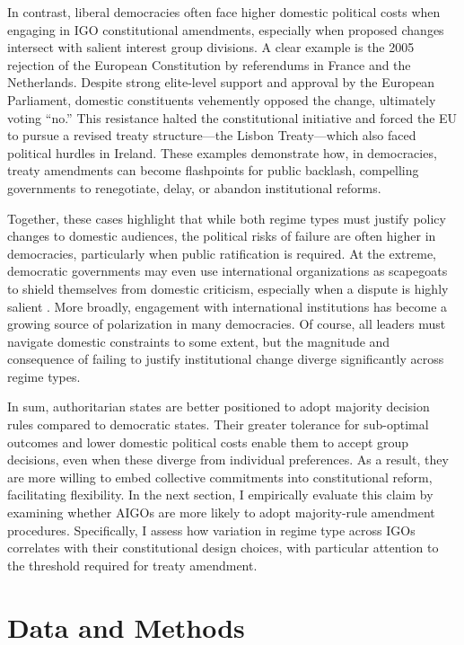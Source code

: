 \documentclass[12pt]{article}
\begin{document}
In contrast, liberal democracies often face higher domestic political costs when engaging in IGO constitutional amendments, especially when proposed changes intersect with salient interest group divisions. A clear example is the 2005 rejection of the European Constitution by referendums in France and the Netherlands. Despite strong elite-level support and approval by the European Parliament, domestic constituents vehemently opposed the change, ultimately voting ``no.'' This resistance halted the constitutional initiative and forced the EU to pursue a revised treaty structure---the Lisbon Treaty---which also faced political hurdles in Ireland. These examples demonstrate how, in democracies, treaty amendments can become flashpoints for public backlash, compelling governments to renegotiate, delay, or abandon institutional reforms.

Together, these cases highlight that while both regime types must justify policy changes to domestic audiences, the political risks of failure are often higher in democracies, particularly when public ratification is required. At the extreme, democratic governments may even use international organizations as scapegoats to shield themselves from domestic criticism, especially when a dispute is highly salient \parencite{lim_why_2022}. More broadly, engagement with international institutions has become a growing source of polarization in many democracies. Of course, all leaders must navigate domestic constraints to some extent, but the magnitude and consequence of failing to justify institutional change diverge significantly across regime types.

In sum, authoritarian states are better positioned to adopt majority decision rules compared to democratic states. Their greater tolerance for sub-optimal outcomes and lower domestic political costs enable them to accept group decisions, even when these diverge from individual preferences. As a result, they are more willing to embed collective commitments into constitutional reform, facilitating flexibility. In the next section, I empirically evaluate this claim by examining whether AIGOs are more likely to adopt majority-rule amendment procedures. Specifically, I assess how variation in regime type across IGOs correlates with their constitutional design choices, with particular attention to the threshold required for treaty amendment.

\section{Data and Methods}
\end{document}
